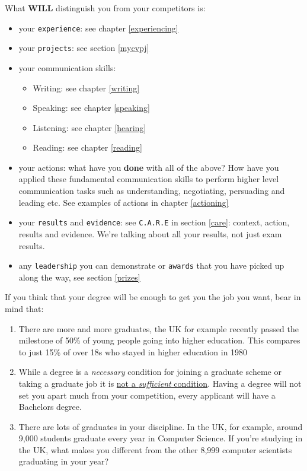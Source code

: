 \documentclass[
]{book}
\providecommand{\tightlist}{%
  \setlength{\itemsep}{0pt}\setlength{\parskip}{0pt}}
\begin{document}
What \textbf{WILL} distinguish you from your competitors is:

\begin{itemize}
\tightlist
\item
  your \texttt{experience}: see chapter \ref{experiencing}
\item
  your \texttt{projects}: see section \ref{mycvpj}
\item
  your communication skills:

  \begin{itemize}
  \tightlist
  \item
    Writing: see chapter \ref{writing}
  \item
    Speaking: see chapter \ref{speaking}
  \item
    Listening: see chapter \ref{hearing}
  \item
    Reading: see chapter \ref{reading}
  \end{itemize}
\item
  your actions: what have you \textbf{done} with all of the above? How have you applied these fundamental communication skills to perform higher level communication tasks such as understanding, negotiating, persuading and leading etc. See examples of actions in chapter \ref{actioning}
\item
  your \texttt{results} and \texttt{evidence}: see \texttt{C.A.R.E} in section \ref{care}: context, action, results and evidence. We're talking about all your results, not just exam results.
\item
  any \texttt{leadership} you can demonstrate or \texttt{awards} that you have picked up along the way, see section \ref{prizes}
\end{itemize}

If you think that your degree will be enough to get you the job you want, bear in mind that:

\begin{enumerate}
\def\labelenumi{\arabic{enumi}.}
\tightlist
\item
  There are more and more graduates, the UK for example recently passed the milestone of 50\% of young people going into higher education. This compares to just 15\% of over 18s who stayed in higher education in 1980 \citep{lotsofgrads}
\item
  While a degree is a \emph{necessary} condition for joining a graduate scheme or taking a graduate job it is \href{https://en.wikipedia.org/wiki/Necessity_and_sufficiency}{not a \emph{sufficient} condition}. Having a degree will not set you apart much from your competition, every applicant will have a Bachelors degree.
\item
  There are lots of graduates in your discipline. In the UK, for example, around 9,000 students graduate every year in Computer Science. If you're studying in the UK, what makes you different from the other 8,999 computer scientists graduating in your year?
\end{enumerate}
\end{document}
